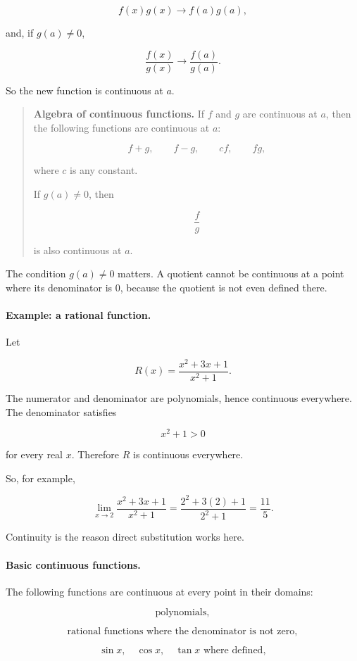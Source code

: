 \[
f(x)g(x)\to f(a)g(a),
\]

and, if \(g(a)\neq0\),

\[
\frac{f(x)}{g(x)}\to \frac{f(a)}{g(a)}.
\]

So the new function is continuous at \(a\).

\begin{quote}
\textbf{Algebra of continuous functions.}
If \(f\) and \(g\) are continuous at \(a\), then the following functions are continuous at \(a\):

\[
f+g,\qquad f-g,\qquad cf,\qquad fg,
\]

where \(c\) is any constant.

If \(g(a)\neq0\), then

\[
\frac{f}{g}
\]

is also continuous at \(a\).
\end{quote}

The condition \(g(a)\neq0\) matters.  A quotient cannot be continuous at a point where its denominator is \(0\), because the quotient is not even defined there.

\paragraph{Example: a rational function.}
Let

\[
R(x)=\frac{x^2+3x+1}{x^2+1}.
\]

The numerator and denominator are polynomials, hence continuous everywhere.  The denominator satisfies

\[
x^2+1>0
\]

for every real \(x\).  Therefore \(R\) is continuous everywhere.

So, for example,

\[
\lim_{x\to2}\frac{x^2+3x+1}{x^2+1}
=
\frac{2^2+3(2)+1}{2^2+1}
=
\frac{11}{5}.
\]

Continuity is the reason direct substitution works here.

\paragraph{Basic continuous functions.}
The following functions are continuous at every point in their domains:

\[
\text{polynomials},
\]

\[
\text{rational functions where the denominator is not zero},
\]

\[
\sin x,\quad \cos x,\quad \tan x\text{ where defined},
\]


